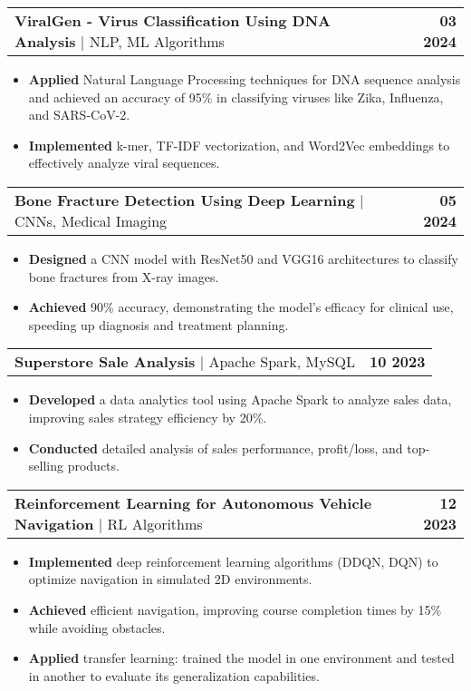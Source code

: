 \documentclass[letterpaper,11pt]{article}
\makeatletter
\newcommand{\resumeItem}[1]{
  \item\small{
    {#1 \vspace{-2pt}}
  }
}
\newcommand{\resumeProjectHeading}[2]{
    \item
    \begin{tabular*}{1.001\textwidth}{l@{\extracolsep{\fill}}r}
      \small#1 & \textbf{\small #2}\\
    \end{tabular*}\vspace{-7pt}
}
\newcommand{\resumeItemListStart}{\begin{itemize}}
\newcommand{\resumeItemListEnd}{\end{itemize}\vspace{-5pt}}
\makeatother
\begin{document}
       \resumeProjectHeading
          {{\textbf{\large{{ViralGen - Virus Classification Using DNA Analysis}}}} $|$ \large{{NLP, ML Algorithms}}}{03 2024}
          \resumeItemListStart
            \resumeItem{\normalsize{\textbf{Applied} Natural Language Processing techniques for DNA sequence analysis and achieved an accuracy of 95\% in classifying viruses like Zika, Influenza, and SARS-CoV-2.}}
            \resumeItem{\normalsize{\textbf{Implemented} k-mer, TF-IDF vectorization, and Word2Vec embeddings to effectively analyze viral sequences.}}
             
          \resumeItemListEnd 
          \vspace{-20pt}
          
       \resumeProjectHeading
          {{\textbf{\large{{Bone Fracture Detection Using Deep Learning}}}} $|$ \large{{CNNs, Medical Imaging}}}{05 2024}
          \resumeItemListStart
            \resumeItem{\normalsize{\textbf{Designed} a CNN model with ResNet50 and VGG16 architectures to classify bone fractures from X-ray images.}}
            \resumeItem{\normalsize{\textbf{Achieved} 90\% accuracy, demonstrating the model's efficacy for clinical use, speeding up diagnosis and treatment planning.}}           
          \resumeItemListEnd 
          \vspace{-13pt}          
  
          
       \resumeProjectHeading
          {{\textbf{\large{{Superstore Sale Analysis}}}} $|$ \large{{Apache Spark, MySQL}}}{10 2023}
          \resumeItemListStart
            \resumeItem{\normalsize{\textbf{Developed} a data analytics tool using Apache Spark to analyze sales data, improving sales strategy efficiency by 20\%.}}
            \resumeItem{\normalsize{\textbf{Conducted} detailed analysis of sales performance, profit/loss, and top-selling products.}}         
          \resumeItemListEnd 
          \vspace{-13pt}   
          
       \resumeProjectHeading
          {{\textbf{\large{{Reinforcement Learning for Autonomous Vehicle Navigation}}}} $|$ \large{{RL Algorithms}}}{12 2023}
          \resumeItemListStart
            \resumeItem{\normalsize{\textbf{Implemented} deep reinforcement learning algorithms (DDQN, DQN) to optimize navigation in simulated 2D environments.}}
            \resumeItem{\normalsize{\textbf{Achieved} efficient navigation, improving course completion times by 15\% while avoiding obstacles.}}  
            \resumeItem{\normalsize{\textbf{Applied} transfer learning: trained the model in one environment and tested in another to evaluate its generalization capabilities.}}
          \resumeItemListEnd 
          \vspace{-13pt}
          
\end{document}
